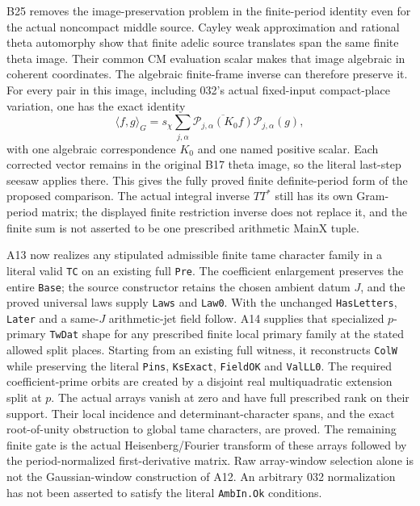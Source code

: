 B25 removes the image-preservation problem in the finite-period
identity even for the actual noncompact middle source. Cayley
weak approximation and rational theta automorphy show that
finite adelic source translates span the same finite theta
image. Their common CM evaluation scalar makes that image
algebraic in coherent coordinates. The algebraic finite-frame
inverse can therefore preserve it. For every pair in this
image, including 032's actual fixed-input compact-place
variation, one has the exact identity
\[
 \langle f,g\rangle_G
   =s_\chi\sum_{j,\alpha}
       \overline{\mathcal P_{j,\alpha}(K_0f)}
                     \mathcal P_{j,\alpha}(g),
\]
with one algebraic correspondence $K_0$ and one named positive
scalar. Each corrected vector remains in the original B17
theta image, so the literal last-step seesaw applies there.
This gives the fully proved finite definite-period form of
the proposed comparison. The actual integral inverse $TT^*$
still has its own Gram-period matrix; the displayed finite
restriction inverse does not replace it, and the finite sum
is not asserted to be one prescribed arithmetic MainX tuple.

A13 now realizes any stipulated admissible finite tame character
family in a literal valid \texttt{TC} on an existing full
\texttt{Pre}. The coefficient enlargement preserves the entire
\texttt{Base}; the source constructor retains the chosen ambient
datum $J$, and the proved universal laws supply \texttt{Laws}
and \texttt{Law0}. With the unchanged \texttt{HasLetters},
\texttt{Later} and a same-$J$ arithmetic-jet field follow.
A14 supplies that specialized $p$-primary \texttt{TwDat} shape
for any prescribed finite local primary family at the stated
allowed split places. Starting from an existing full witness,
it reconstructs \texttt{ColW} while preserving the literal
\texttt{Pins}, \texttt{KsExact}, \texttt{FieldOK} and
\texttt{ValLL0}. The required coefficient-prime orbits are
created by a disjoint real multiquadratic extension split at $p$.
The actual arrays vanish at zero and have full prescribed rank
on their support. Their local incidence and determinant-character
spans, and the exact root-of-unity obstruction to global tame
characters, are proved. The remaining finite gate is the actual
Heisenberg/Fourier transform of these arrays followed by the
period-normalized first-derivative matrix. Raw array-window
selection alone is not the Gaussian-window construction of A12.
An arbitrary 032 normalization has not been asserted to satisfy
the literal \texttt{AmbIn.Ok} conditions.

